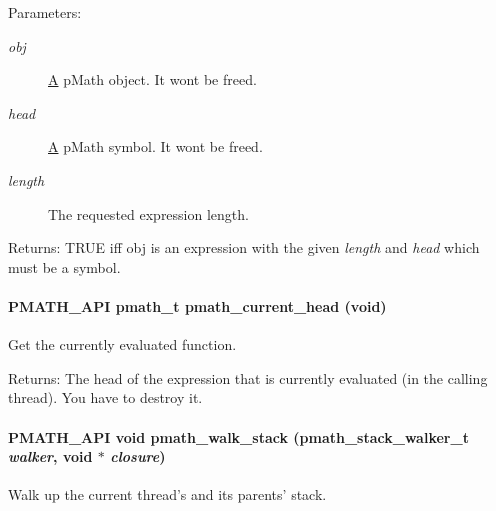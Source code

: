 \begin{Desc}
\item[Parameters:]
\begin{description}
\item[{\em obj}]\hyperlink{class_a}{A} pMath object. It wont be freed. \item[{\em head}]\hyperlink{class_a}{A} pMath symbol. It wont be freed. \item[{\em length}]The requested expression length. \end{description}
\end{Desc}
\begin{Desc}
\item[Returns:]TRUE iff obj is an expression with the given {\em length\/} and {\em head\/} which must be a symbol. \end{Desc}
\hypertarget{group__helpers_g70aa270956b6c8f8eb43431f9775ae88}{
\paragraph[{pmath\_\-current\_\-head}]{\setlength{\rightskip}{0pt plus 5cm}PMATH\_\-API {\bf pmath\_\-t} pmath\_\-current\_\-head (void)}\hfill}
\label{group__helpers_g70aa270956b6c8f8eb43431f9775ae88}


Get the currently evaluated function. 

\begin{Desc}
\item[Returns:]The head of the expression that is currently evaluated (in the calling thread). You have to destroy it. \end{Desc}
\hypertarget{group__helpers_g55213cb0c89952b6aacf90f36ad4047b}{
\paragraph[{pmath\_\-walk\_\-stack}]{\setlength{\rightskip}{0pt plus 5cm}PMATH\_\-API void pmath\_\-walk\_\-stack ({\bf pmath\_\-stack\_\-walker\_\-t} {\em walker}, \/  void $\ast$ {\em closure})}\hfill}
\label{group__helpers_g55213cb0c89952b6aacf90f36ad4047b}


Walk up the current thread's and its parents' stack. 


